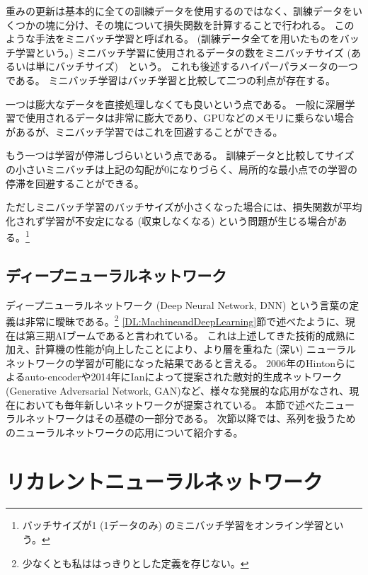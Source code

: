 重みの更新は基本的に全ての訓練データを使用するのではなく、訓練データをいくつかの塊に分け、その塊について損失関数を計算することで行われる。
このような手法をミニバッチ学習と呼ばれる。
(訓練データ全てを用いたものをバッチ学習という。)
ミニバッチ学習に使用されるデータの数をミニバッチサイズ (あるいは単にバッチサイズ)　という。
これも後述するハイパーパラメータの一つである。
ミニバッチ学習はバッチ学習と比較して二つの利点が存在する。

一つは膨大なデータを直接処理しなくても良いという点である。
一般に深層学習で使用されるデータは非常に膨大であり、GPUなどのメモリに乗らない場合があるが、ミニバッチ学習ではこれを回避することができる。

もう一つは学習が停滞しづらいという点である。
訓練データと比較してサイズの小さいミニバッチは上記の勾配が0になりづらく、局所的な最小点での学習の停滞を回避することができる。

ただしミニバッチ学習のバッチサイズが小さくなった場合には、損失関数が平均化されず学習が不安定になる (収束しなくなる) という問題が生じる場合がある。\footnote{バッチサイズが1 (1データのみ) のミニバッチ学習をオンライン学習という。}


\subsection{ディープニューラルネットワーク} \label{DL:NN:DeepNeuralNetwork}

ディープニューラルネットワーク (Deep Neural Network, DNN) という言葉の定義は非常に曖昧である。\footnote{少なくとも私ははっきりとした定義を存じない。}
\ref{DL:MachineandDeepLearning}節で述べたように、現在は第三期AIブームであると言われている。
これは上述してきた技術的成熟に加え、計算機の性能が向上したことにより、より層を重ねた (深い) ニューラルネットワークの学習が可能になった結果であると言える。
2006年のHintonらによるauto-encoder\cite{Autoencoder}や2014年にIanによって提案された敵対的生成ネットワーク (Generative Adversarial Network, GAN\cite{GenerativeAdversarialNetworks})など、様々な発展的な応用がなされ、現在においても毎年新しいネットワークが提案されている。
本節で述べたニューラルネットワークはその基礎の一部分である。
次節以降では、系列を扱うためのニューラルネットワークの応用について紹介する。


\section{リカレントニューラルネットワーク} \label{DL:RecurrentNeuralNetwork}

